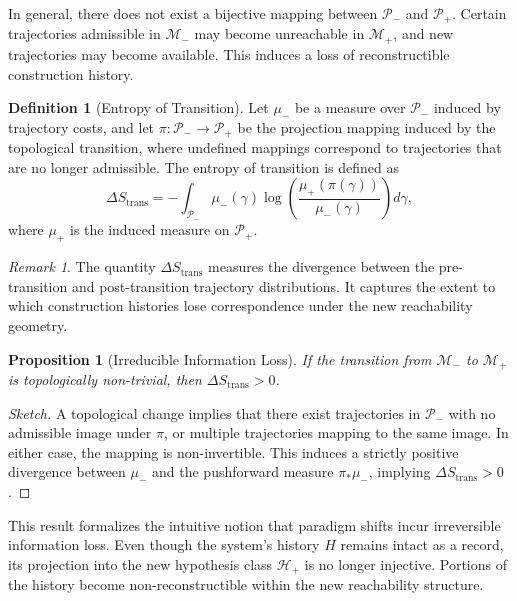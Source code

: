 \documentclass[12pt]{article}
\theoremstyle{plain}
\newtheorem{proposition}[theorem]{Proposition}
\theoremstyle{definition}
\newtheorem{definition}[theorem]{Definition}
\theoremstyle{remark}
\newtheorem{remark}[theorem]{Remark}
\begin{document}
In general, there does not exist a bijective mapping between $\mathcal{P}_-$ and $\mathcal{P}_+$. Certain trajectories admissible in $\mathcal{M}_-$ may become unreachable in $\mathcal{M}_+$, and new trajectories may become available. This induces a loss of reconstructible construction history.

\begin{definition}[Entropy of Transition]
Let $\mu_-$ be a measure over $\mathcal{P}_-$ induced by trajectory costs, and let $\pi : \mathcal{P}_- \to \mathcal{P}_+$ be the projection mapping induced by the topological transition, where undefined mappings correspond to trajectories that are no longer admissible. The entropy of transition is defined as
\[
\Delta S_{\mathrm{trans}} = - \int_{\mathcal{P}_-} \mu_-(\gamma) \log \left( \frac{\mu_+(\pi(\gamma))}{\mu_-(\gamma)} \right) d\gamma,
\]
where $\mu_+$ is the induced measure on $\mathcal{P}_+$.
\end{definition}

\begin{remark}
The quantity $\Delta S_{\mathrm{trans}}$ measures the divergence between the pre-transition and post-transition trajectory distributions. It captures the extent to which construction histories lose correspondence under the new reachability geometry.
\end{remark}

\begin{proposition}[Irreducible Information Loss]
If the transition from $\mathcal{M}_-$ to $\mathcal{M}_+$ is topologically non-trivial, then $\Delta S_{\mathrm{trans}} > 0$.
\end{proposition}

\begin{proof}[Sketch]
A topological change implies that there exist trajectories in $\mathcal{P}_-$ with no admissible image under $\pi$, or multiple trajectories mapping to the same image. In either case, the mapping is non-invertible. This induces a strictly positive divergence between $\mu_-$ and the pushforward measure $\pi_* \mu_-$, implying $\Delta S_{\mathrm{trans}} > 0$.
\end{proof}

This result formalizes the intuitive notion that paradigm shifts incur irreversible information loss. Even though the system's history $H$ remains intact as a record, its projection into the new hypothesis class $\mathcal{H}_+$ is no longer injective. Portions of the history become non-reconstructible within the new reachability structure.
\end{document}
